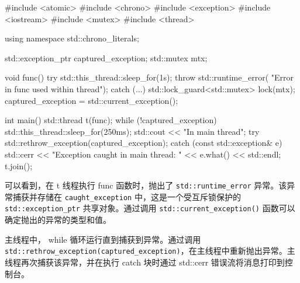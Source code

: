 \begin{cpp}
#include <atomic>
#include <chrono>
#include <exception>
#include <iostream>
#include <mutex>
#include <thread>

using namespace std::chrono_literals;

std::exception_ptr captured_exception;
std::mutex mtx;

void func() {
    try {
        std::this_thread::sleep_for(1s);
        throw std::runtime_error(
        "Error in func used within thread");
    } catch (...) {
        std::lock_guard<std::mutex> lock(mtx);
        captured_exception = std::current_exception();
    }
}

int main() {
    std::thread t(func);
    while (!captured_exception) {
        std::this_thread::sleep_for(250ms);
        std::cout << "In main thread\n";
    }
    try {
        std::rethrow_exception(captured_exception);
    } catch (const std::exception& e) {
        std::cerr << "Exception caught in main thread: "
        << e.what() << std::endl;
    }
    t.join();
}
\end{cpp}

可以看到，在 t 线程执行 func 函数时，抛出了 \verb|std::runtime_error| 异常。该异常捕获并存储在 \verb|caught_exception| 中，这是一个受互斥锁保护的 \verb|std::exception_ptr| 共享对象。通过调用 \verb|std::current_exception()| 函数可以确定抛出的异常的类型和值。

主线程中， while 循环运行直到捕获到异常。通过调用 \verb|std::rethrow_exception(captured_exception)|，在主线程中重新抛出异常。主线程再次捕获该异常，并在执行 catch 块时通过 std::cerr 错误流将消息打印到控制台。












